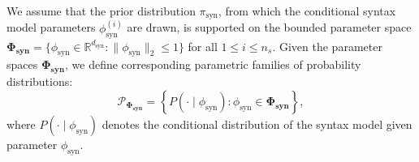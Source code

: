 \documentclass[11pt]{article}
\theoremstyle{plain}
\theoremstyle{definition}
\newcommand{\numsyntax}{n_s}
\newcommand{\knowledge}{v^*}
\newcommand{\synModel}{\phi_{\text{syn}}}
\newcommand{\synfamily}{\mathbf{\Phi_{\text{syn}}}}
\newcommand{\synprobability}{\mathcal{P}_{\boldsymbol{\Phi_{\text{syn}}}}}
\newcommand{\syndimension}{d_{\text{syn}}}
\newcommand{\synprior}{\pi_{\text{syn}}}
\newcommand{\jian}[1]{{\it \color{red}{Jian: #1}}}
\begin{document}
We assume that the prior distribution \( \synprior \), from which the conditional syntax model parameters \( \synModel^{(i)} \) are drawn, is supported on the bounded parameter space 
\( \synfamily = \{ \synModel \in \mathbb{R}^{\syndimension} : \|\synModel\|_{2} \le 1 \} \) 
for all \( 1 \le i \le \numsyntax \).
 Given the parameter spaces \( \synfamily \), we define corresponding parametric families of probability distributions:
\[
\synprobability = \left\{ P(\cdot\mid \synModel) : \synModel \in \synfamily \right\},
\]
where \( P(\cdot\mid \synModel) \) denotes the conditional distribution of the syntax model given parameter \( \synModel \).






\end{document}

